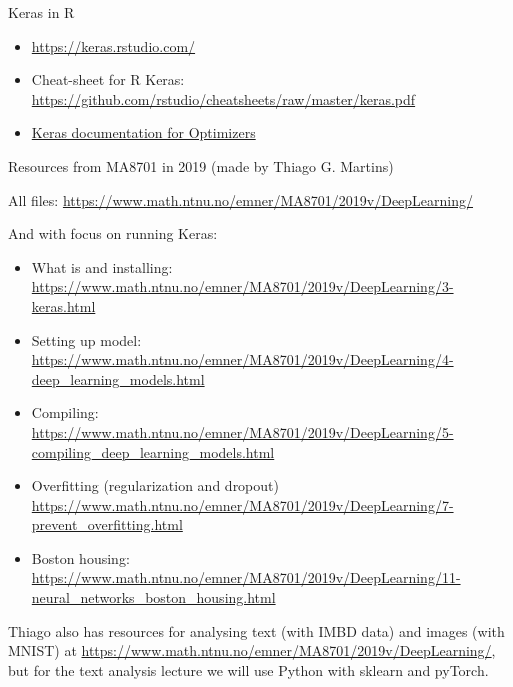\documentclass[
  ignorenonframetext,
]{beamer}
\providecommand{\tightlist}{%
  \setlength{\itemsep}{0pt}\setlength{\parskip}{0pt}}
\begin{document}
\begin{frame}{Keras in R}
\protect\hypertarget{keras-in-r}{}
\begin{itemize}
\tightlist
\item
  \url{https://keras.rstudio.com/}
\item
  Cheat-sheet for R Keras:
  \url{https://github.com/rstudio/cheatsheets/raw/master/keras.pdf}
\item
  \href{https://keras.io/optimizers/}{Keras documentation for
  Optimizers}
\end{itemize}

\begin{block}{Resources from MA8701 in 2019}
\protect\hypertarget{resources-from-ma8701-in-2019}{}
(made by Thiago G. Martins)

All files:
\url{https://www.math.ntnu.no/emner/MA8701/2019v/DeepLearning/}

And with focus on running Keras:

\begin{itemize}
\tightlist
\item
  What is and installing:
  \url{https://www.math.ntnu.no/emner/MA8701/2019v/DeepLearning/3-keras.html}
\item
  Setting up model:
  \url{https://www.math.ntnu.no/emner/MA8701/2019v/DeepLearning/4-deep_learning_models.html}
\item
  Compiling:
  \url{https://www.math.ntnu.no/emner/MA8701/2019v/DeepLearning/5-compiling_deep_learning_models.html}
\item
  Overfitting (regularization and dropout)
  \url{https://www.math.ntnu.no/emner/MA8701/2019v/DeepLearning/7-prevent_overfitting.html}
\item
  Boston housing:
  \url{https://www.math.ntnu.no/emner/MA8701/2019v/DeepLearning/11-neural_networks_boston_housing.html}
\end{itemize}

Thiago also has resources for analysing text (with IMBD data) and images
(with MNIST) at
\url{https://www.math.ntnu.no/emner/MA8701/2019v/DeepLearning/}, but for
the text analysis lecture we will use Python with sklearn and pyTorch.
\end{block}
\end{frame}
\end{document}
